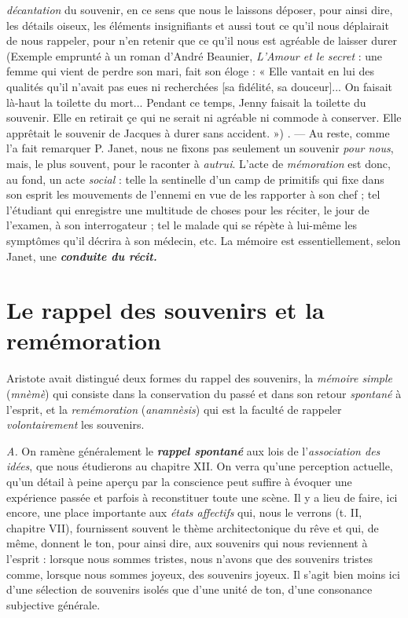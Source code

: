 {\it décantation} du souvenir, en ce sens que nous le laissons déposer, pour
ainsi dire, les détails oiseux, les éléments insignifiants et aussi tout ce
qu’il nous déplairait de nous rappeler, pour n’en retenir que ce qu’il
nous est agréable de laisser durer
{\scriptsize (Exemple emprunté à un roman d'André Beaunier, {\it L'Amour et le secret} : une femme
qui vient de perdre son mari, fait son éloge : « Elle vantait en lui des qualités qu’il n'avait
pas eues ni recherchées [sa fidélité, sa douceur]... On faisait là-haut la toilette du mort...
Pendant ce temps, Jenny faisait la toilette du souvenir. Elle en retirait çe qui ne serait
ni agréable ni commode à conserver. Elle apprêtait le souvenir de Jacques à durer sans
accident. »)}
. — Au reste, comme l’a fait remarquer
P. Janet, nous ne fixons pas seulement un souvenir {\it pour nous},
mais, le plus souvent, pour le raconter à {\it autrui}. L’acte de {\it mémoration}
est donc, au fond, un acte {\it social} : telle la sentinelle d’un camp de
primitifs qui fixe dans son esprit les mouvements de l’ennemi en vue
de les rapporter à son chef ; tel l’étudiant qui enregistre une multitude
de choses pour les réciter, le jour de l’examen, à son interrogateur ;
tel le malade qui se répète à lui-même les symptômes qu’il
décrira à son médecin, etc. La mémoire est essentiellement, selon
Janet, une \textbf{\textit {conduite du récit.}}

\section{Le rappel des souvenirs et la remémoration}%
Aristote
avait distingué deux formes du rappel des souvenirs, la {\it mémoire
simple} ({\it mnèmè}) qui consiste dans la conservation du passé et dans son
retour {\it spontané }à l'esprit, et la {\it remémoration} ({\it anamnèsis}) qui est la
faculté de rappeler {\it volontairement} les souvenirs.

{\it A.} On ramène généralement le \textbf{\textit {rappel spontané}} aux lois de l’{\it association
des idées}, que nous étudierons au chapitre XII. On verra qu’une
perception actuelle, qu’un détail à peine aperçu par la conscience
peut suffire à évoquer une expérience passée et parfois à reconstituer
toute une scène. Il y a lieu de faire, ici encore, une place importante
aux {\it états affectifs} qui, nous le verrons (t. II, chapitre VII), fournissent
souvent le thème architectonique du rêve et qui, de même,
donnent le ton, pour ainsi dire, aux souvenirs qui nous reviennent à
l'esprit : lorsque nous sommes tristes, nous n’avons que des souvenirs
tristes comme, lorsque nous sommes joyeux, des souvenirs
joyeux. Il s’agit bien moins ici d’une sélection de souvenirs isolés que
d’une unité de ton, d’une consonance subjective générale.

